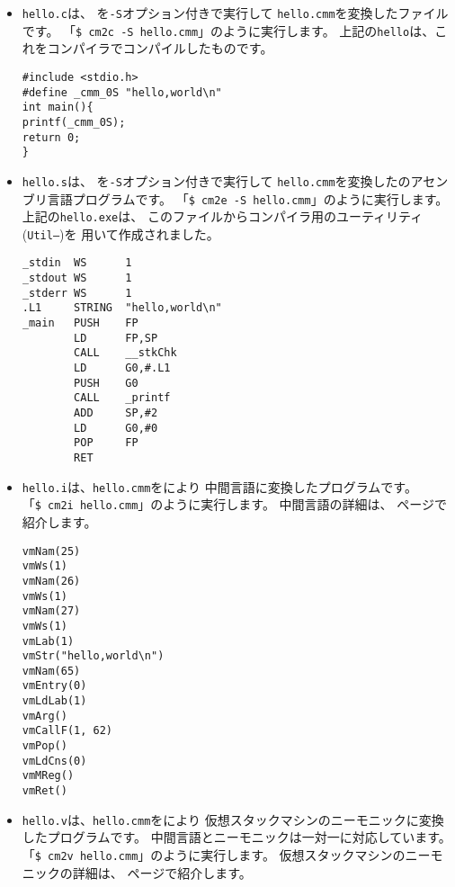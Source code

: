 \begin{itemize}

\item {\tt hello.c}は、
{\cmc}を{\tt -S}オプション付きで実行して
{\tt hello.cmm}を変換した{\cl}ファイルです。
「\verb/$ cm2c -S hello.cmm/」のように実行します。
上記の{\tt hello}は、これを{\cl}コンパイラでコンパイルしたものです。

\begin{mylist}
\begin{verbatim}
#include <stdio.h>
#define _cmm_0S "hello,world\n"
int main(){
printf(_cmm_0S);
return 0;
}
\end{verbatim}
\end{mylist}

\item {\tt hello.s}は、
{\cme}を{\tt -S}オプション付きで実行して
{\tt hello.cmm}を変換した{\tac}のアセンブリ言語プログラムです。
「\verb/$ cm2e -S hello.cmm/」のように実行します。
上記の{\tt hello.exe}は、
このファイルから{\cmm}コンパイラ用のユーティリティ({\tt Util--})を
用いて作成されました。

\begin{mylist}
\begin{verbatim}
_stdin  WS      1
_stdout WS      1
_stderr WS      1
.L1     STRING  "hello,world\n"
_main   PUSH    FP
        LD      FP,SP
        CALL    __stkChk
        LD      G0,#.L1
        PUSH    G0
        CALL    _printf
        ADD     SP,#2
        LD      G0,#0
        POP     FP
        RET
\end{verbatim}
\end{mylist}

\item {\tt hello.i}は、{\tt hello.cmm}を{\cmi}により
中間言語に変換したプログラムです。\\
「\verb/$ cm2i hello.cmm/」のように実行します。
中間言語の詳細は、
\pageref{app:vm}ページで紹介します。

\begin{mylist}
\begin{verbatim}
vmNam(25)
vmWs(1)
vmNam(26)
vmWs(1)
vmNam(27)
vmWs(1)
vmLab(1)
vmStr("hello,world\n")
vmNam(65)
vmEntry(0)
vmLdLab(1)
vmArg()
vmCallF(1, 62)
vmPop()
vmLdCns(0)
vmMReg()
vmRet()
\end{verbatim}
\end{mylist}

\item {\tt hello.v}は、{\tt hello.cmm}を{\cmv}により
仮想スタックマシンのニーモニックに変換したプログラムです。
中間言語とニーモニックは一対一に対応しています。\\
「\verb/$ cm2v hello.cmm/」のように実行します。
仮想スタックマシンのニーモニックの詳細は、
\pageref{app:vm}ページで紹介します。


\end{itemize}
